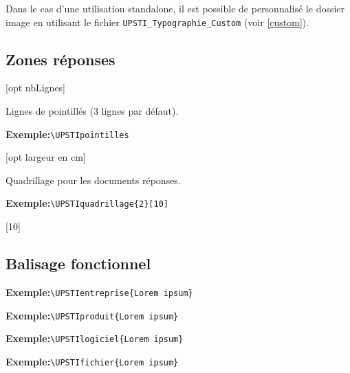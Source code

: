 \documentclass[11pt]{ltxdockit}[2010/09/26]
\newcommand{\ex}{\noindent \textbf{Exemple:}\quad}
\begin{document}
Dans le cas d'une utilisation standalone, il est possible de personnalisé le dossier image en utilisant le fichier \texttt{UPSTI\_Typographie\_Custom} (voir \ref{custom}).

\subsection{\og Zones\fg{} réponses}
\begin{ltxsyntax}
[opt nbLignes]
\end{ltxsyntax}
Lignes de pointillés (3 lignes par défaut).

\ex\verb!\UPSTIpointilles!

\UPSTIpointilles{}

\begin{ltxsyntax}
[opt largeur en cm]
\end{ltxsyntax}
Quadrillage pour les documents réponses.

\ex\verb!\UPSTIquadrillage{2}[10]!

[10]

\subsection{\og Balisage\fg{} fonctionnel}
\begin{ltxsyntax}
\end{ltxsyntax}
\ex\verb!\UPSTIentreprise{Lorem ipsum}!

\vspace{1em}

\vspace{1em}
\begin{ltxsyntax}
\end{ltxsyntax}
\ex\verb!\UPSTIproduit{Lorem ipsum}!

\vspace{1em}

\vspace{1em}
\begin{ltxsyntax}
\end{ltxsyntax}
\ex\verb!\UPSTIlogiciel{Lorem ipsum}!

\vspace{1em}
\vspace{1em}
\begin{ltxsyntax}
\end{ltxsyntax}
\ex\verb!\UPSTIfichier{Lorem ipsum}!
\end{document}
